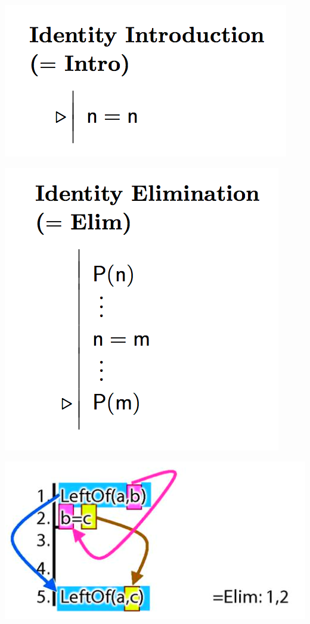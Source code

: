 \documentclass[12pt]{extarticle}
\begin{document}
\begin{multicols*}{3}
\begin{center}
\includegraphics[scale=0.3]{img/rule_identity_intro.png}
\end{center}
\begin{center}
\includegraphics[scale=0.3]{img/rule_identity_elim.png}
\end{center}
\begin{center}
\includegraphics[scale=0.3]{img/proof_identity_example.png}
\end{center}
 

\end{multicols*}
\end{document}

